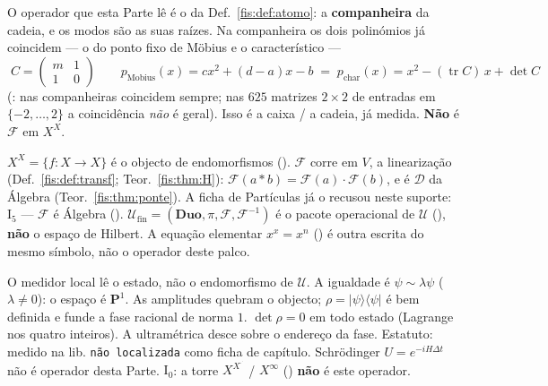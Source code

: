 \documentclass[livro.tex]{subfiles}
\begin{document}
\begin{observacao}\label{fis:obs:quantica-operador}
O operador que esta Parte lê é o da Def.~\ref{fis:def:atomo}: a
\textbf{companheira} da cadeia, e os modos são as suas raízes. Na
companheira os dois polinómios já coincidem --- o do ponto fixo de
Möbius e o característico ---
\[
\boxed{\;
C=\begin{pmatrix}m&1\\1&0\end{pmatrix}
\qquad
p_{\mathrm{Mobius}}(x)=cx^{2}+(d-a)x-b
\;=\;
p_{\mathrm{char}}(x)=x^{2}-(\operatorname{tr}C)\,x+\det C
\;}
\]
(: nas companheiras coincidem sempre; nas
\(625\) matrizes \(2{\times}2\) de entradas em \(\{-2,\ldots,2\}\) a
coincidência \emph{não} é geral). Isso é a caixa / a cadeia, já
medida. \textbf{Não} é \(\mathcal{F}\) em \(X^{X}\).

\(X^{X}=\{f\colon X\to X\}\) é o objecto de endomorfismos
(). \(\mathcal{F}\) corre em \(V\), a
linearização (Def.~\ref{fis:def:transf}; Teor.~\ref{fis:thm:H}):
\(\mathcal{F}(a\ast b)=\mathcal{F}(a)\cdot\mathcal{F}(b)\), e é
\(\mathcal{D}\) da Álgebra (Teor.~\ref{fis:thm:ponte}). A ficha de
Partículas já o recusou neste suporte:
\(\mathrm{I}_{5}\) --- \(\mathcal{F}\) é Álgebra
().
\(\mathcal{U}_{\mathrm{fin}}=(\mathbf{Duo},\pi,\mathcal{F},\mathcal{F}^{-1})\)
é o pacote operacional de \(\mathcal{U}\)
(), \textbf{não} o espaço de Hilbert.
A equação elementar \(x^{x}=x^{n}\) () é outra
escrita do mesmo símbolo, não o operador deste palco.

O medidor local lê o estado, não o endomorfismo de \(\mathcal{U}\).
A igualdade é \(\psi\sim\lambda\psi\) (\(\lambda\neq0\)): o espaço é
\(\mathbf{P}^{1}\). As amplitudes quebram o objecto; \(\rho=\lvert\psi\rangle\langle\psi\rvert\)
é bem definida e funde a fase racional de norma \(1\).
\(\det\rho=0\) em todo estado (Lagrange nos quatro inteiros). A
ultramétrica desce sobre o endereço da fase. Estatuto: medido na lib.
\texttt{não localizada} como ficha de capítulo. Schrödinger
\(U=e^{-iH\Delta t}\) não é operador desta Parte.
\(\mathrm{I}_{0}\): a torre \(X^{X^{\cdot^{\cdot}}}\) /
\(X^{\infty}\) () \textbf{não} é este
operador.
\end{observacao}

\end{document}

